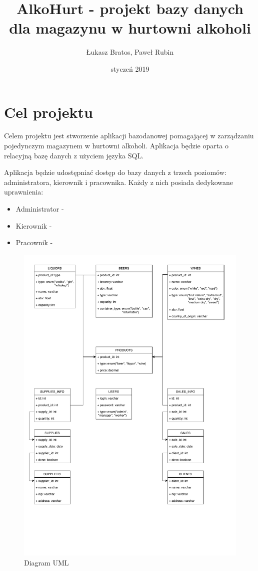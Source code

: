 \documentclass[12pt,a4paper]{article}
\author{Łukasz Bratos, Paweł Rubin}
\title{AlkoHurt - projekt bazy danych dla magazynu w hurtowni alkoholi}
\date{styczeń 2019}
\begin{document}
\maketitle

\section*{Cel projektu}

    Celem projektu jest stworzenie aplikacji bazodanowej pomagającej w zarządzaniu pojedynczym magazynem w hurtowni alkoholi. Aplikacja będzie oparta o relacyjną bazę danych z użyciem języka SQL.
    
    Aplikacja będzie udostępniać dostęp do bazy danych z trzech poziomów: administratora, kierownik i pracownika. Każdy z nich posiada dedykowane uprawnienia:
    \begin{itemize}
        \item Administrator - 
        \item Kierownik - 
        \item Pracownik - 
    \end{itemize}
    
\begin{figure}
    \centering
    
    \includegraphics[width=\columnwidth]{uml}
    \caption{Diagram UML}
    \label{fig: diagram}
\end{figure}
    
    
\end{document}
